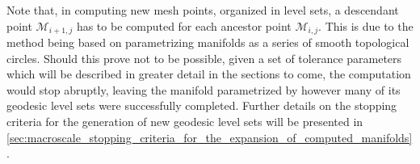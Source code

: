 Note that, in computing new mesh points, organized in level sets, a descendant
point $\mathcal{M}_{i+1,j}$ has to be computed for each ancestor point
$\mathcal{M}_{i,j}$. This is due to the method being based on parametrizing
manifolds as a series of smooth topological circles. Should this prove
not to be possible, given a set of tolerance parameters which will be
described in greater detail in the sections to come, the computation would
stop abruptly, leaving the manifold parametrized by however many of its
geodesic level sets were successfully completed. Further details on the
stopping criteria for the generation of new geodesic level sets will be
presented in
\cref{sec:macroscale_stopping_criteria_for_the_expansion_of_computed_manifolds}.
